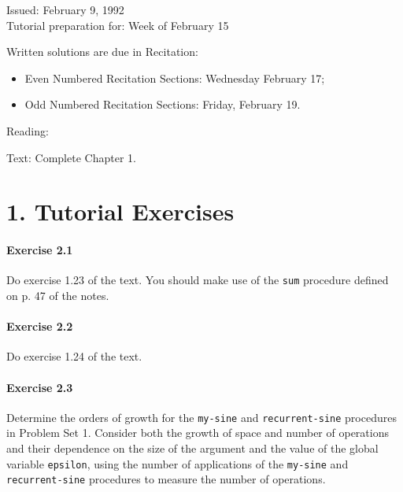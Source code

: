 


 \def\fbox#1{%
  \vtop{\vbox{\hrule%
     \hbox{\vrule\kern3pt%
 \vtop{\vbox{\kern3pt#1}\kern3pt}%
 \kern3pt\vrule}}%
 \hrule}}




\medskip

\begin{flushleft}
Issued:  February 9, 1992 \\
\smallskip
Tutorial preparation for: Week of February 15 \\
\smallskip

Written solutions are due in Recitation:
\begin{itemize}
\item Even Numbered Recitation Sections: Wednesday February 17;
\item Odd Numbered Recitation Sections: Friday, February 19.
\end{itemize}

\smallskip


Reading:
\begin{tightlist}

\item Text: Complete Chapter 1.

\end{tightlist}
\end{flushleft}

\section{1. Tutorial Exercises}

\paragraph{Exercise 2.1}
Do exercise 1.23 of the text. You should make use of the
{\tt sum} procedure defined on p. 47 of the notes.

\paragraph{Exercise 2.2}
Do exercise 1.24 of the text.

\paragraph{Exercise 2.3}
Determine the orders of growth for the {\tt my-sine}
and {\tt recurrent-sine} procedures in Problem Set 1.
Consider both the growth
of space and number of operations and their dependence on the
size of the argument and the value of the global variable {\tt epsilon},
using the number of
applications of the {\tt my-sine} and {\tt recurrent-sine}
procedures to measure the number of operations.

